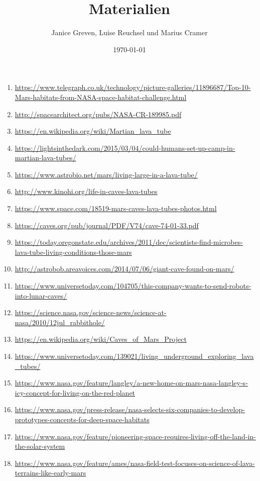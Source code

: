 \documentclass{article}
\title{\textbf{Materialien}}
\author{Janice Greven, Luise Reuchsel und Marius Cramer}
\date{\today}
\begin{document}
\maketitle
\begin{enumerate}
  \item \url{https://www.telegraph.co.uk/technology/picture-galleries/11896687/Top-10-Mars-habitats-from-NASA-space-habitat-challenge.html}
  \item \url{http://spacearchitect.org/pubs/NASA-CR-189985.pdf}
  \item \url{https://en.wikipedia.org/wiki/Martian_lava_tube}
  \item \url{https://lightsinthedark.com/2015/03/04/could-humans-set-up-camp-in-martian-lava-tubes/}
  \item \url{https://www.astrobio.net/mars/living-large-in-a-lava-tube/}
  \item \url{http://www.kinohi.org/life-in-caves-lava-tubes}
  \item \url{https://www.space.com/18519-mars-caves-lava-tubes-photos.html}
  \item \url{https://caves.org/pub/journal/PDF/V74/cave-74-01-33.pdf}
  \item \url{https://today.oregonstate.edu/archives/2011/dec/scientists-find-microbes-lava-tube-living-conditions-those-mars}
  \item \url{http://astrobob.areavoices.com/2014/07/06/giant-cave-found-on-mars/}
  \item \url{https://www.universetoday.com/104705/this-company-wants-to-send-robots-into-lunar-caves/}
    \item \url{https://science.nasa.gov/science-news/science-at-nasa/2010/12jul_rabbithole/}
  \item \url{https://en.wikipedia.org/wiki/Caves_of_Mars_Project}
  \item \url{https://www.universetoday.com/139021/living_underground_exploring_lava_tubes/}
  \item \url{https://www.nasa.gov/feature/langley/a-new-home-on-mars-nasa-langley-s-icy-concept-for-living-on-the-red-planet}
  \item \url{https://www.nasa.gov/press-release/nasa-selects-six-companies-to-develop-prototypes-concepts-for-deep-space-habitats}
  \item \url{https://www.nasa.gov/feature/pioneering-space-requires-living-off-the-land-in-the-solar-system}
  \item \url{https://www.nasa.gov/feature/ames/nasa-field-test-focuses-on-science-of-lava-terrains-like-early-mars}

\end{enumerate}
\end{document}
